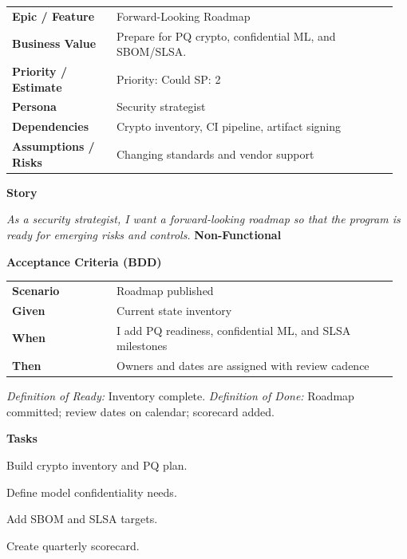 \documentclass[11pt,letterpaper]{article}
\makeatletter
\newenvironment{kvtable}{%
  \begin{tabular}{@{}>{\bfseries\arraybackslash}p{0.26\linewidth} p{0.70\linewidth}@{}}
}{\end{tabular}}
\newenvironment{bdd}{%
  \begin{tabular}{@{}>{\bfseries\arraybackslash}p{0.26\linewidth} p{0.70\linewidth}@{}}
}{\end{tabular}}
\newcommand{\DoRDoD}[2]{%
  \vspace{0.35em}
  {\footnotesize\color{Muted}%
    \textit{Definition of Ready:} #1 \; \textbullet\;
    \textit{Definition of Done:} #2%
  }%
}
\newenvironment{storycard}[2]{%
  \begin{tcolorbox}[cloudcard, title={#1 --- #2}]%
}{\end{tcolorbox}}
\newcommand{\sectionlabel}[1]{\vspace{0.35em}\textbf{#1}\par}
\makeatother
\begin{document}
\begin{storycard}{CCS-34}{Ch. 34 — Future Directions, Risks \& Challenges}
\begin{kvtable}
Epic / Feature & Forward-Looking Roadmap\\
Business Value & Prepare for PQ crypto, confidential ML, and SBOM/SLSA.\\
Priority / Estimate & Priority: Could \quad SP: 2\\
Persona & Security strategist\\
Dependencies & Crypto inventory, CI pipeline, artifact signing\\
Assumptions / Risks & Changing standards and vendor support\\
\end{kvtable}
\sectionlabel{Story}
\textit{As a security strategist, I want a forward-looking roadmap so that the program is ready for emerging risks and controls.}
\sectionlabel{Non-Functional}\;
\sectionlabel{Acceptance Criteria (BDD)}
\begin{bdd}
Scenario & Roadmap published\\
Given & Current state inventory\\
When & I add PQ readiness, confidential ML, and SLSA milestones\\
Then & Owners and dates are assigned with review cadence\\
\end{bdd}
\DoRDoD{Inventory complete.}{Roadmap committed; review dates on calendar; scorecard added.}
\sectionlabel{Tasks}
\begin{checklist}
\item Build crypto inventory and PQ plan.
\item Define model confidentiality needs.
\item Add SBOM and SLSA targets.
\item Create quarterly scorecard.
\end{checklist}
\end{storycard}

\end{document}
